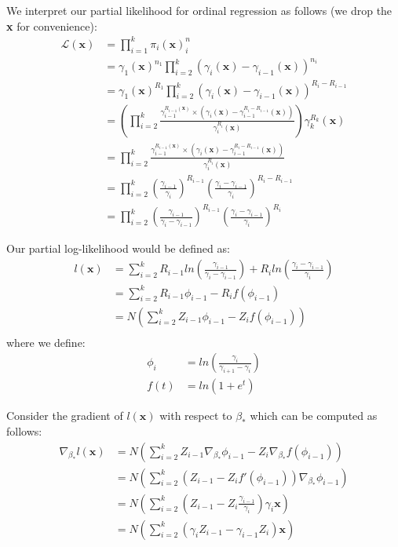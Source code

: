 \documentclass[a4paper, 11pt]{article}
\begin{document}
We interpret our partial likelihood for ordinal regression as follows (we drop the \textbf{x} for convenience):
\begin{align}
    \mathcal{L(\textbf{x})} &= \prod_{i=1}^k \pi_i(\textbf{x})^n_i \\
    &= \gamma_1(\textbf{x})^{n_1} \prod_{i=2}^k (\gamma_i(\textbf{x}) - \gamma_{i-1}(\textbf{x}))^{n_i} \\
    &= \gamma_1(\textbf{x})^{R_1} \prod_{i=2}^k (\gamma_i(\textbf{x}) - \gamma_{i-1}(\textbf{x}))^{R_i - R_{i-1}} \\
    &= \left( \prod_{i=2}^k \frac{\gamma_{i-1}^{R_{i-1}(\textbf{x})} \times (\gamma_i(\textbf{x}) - \gamma_{i-1}^{R_i - R_{i-1}}(\textbf{x}))}{\gamma_{i}^{R_{i}}(\textbf{x})} \right) \gamma_k^{R_k}(\textbf{x})\\
    &= \prod_{i=2}^k \frac{\gamma_{i-1}^{R_{i-1}(\textbf{x})} \times (\gamma_i(\textbf{x}) - \gamma_{i-1}^{R_i - R_{i-1}}(\textbf{x}))}{\gamma_{i}^{R_{i}}(\textbf{x})} \\
    &= \prod_{i=2}^k \left(\frac{\gamma_{i-1}}{\gamma_i}\right)^{R_{i-1}} \left(\frac{\gamma_i - \gamma_{i-1}}{\gamma_i}\right)^{R_i - R_{i-1}} \\
    &= \prod_{i=2}^k \left(\frac{\gamma_{i-1}}{\gamma_i - \gamma_{i-1}}\right)^{R_{i-1}} \left(\frac{\gamma_i - \gamma_{i-1}}{\gamma_i}\right)^{R_i}
\end{align}

Our partial log-likelihood would be defined as:
\begin{align}
    l(\textbf{x}) &= \sum_{i=2}^k R_{i-1}ln\left(\frac{\gamma_{i-1}}{\gamma_i - \gamma_{i-1}}\right) + R_iln\left(\frac{\gamma_i - \gamma_{i-1}}{\gamma_i}\right) \\
    &= \sum_{i=2}^k R_{i-1}\phi_{i-1} - R_i f(\phi_{i-1}) \\
    &= N \left( \sum_{i=2}^k Z_{i-1}\phi_{i-1} - Z_i f(\phi_{i-1}) \right) \\
\end{align}
where we define:
\begin{align}
    \phi_{i} &= ln\left(\frac{\gamma_{i}}{\gamma_{i+1} - \gamma_{i}}\right) \\
    f(t) &= ln(1 + e^t)
\end{align}

Consider the gradient of $l(\textbf{x})$ with respect to $\beta_*$ which can be computed as follows:
\begin{align}
    \nabla_{\beta_*}l(\textbf{x}) &= N \left( \sum_{i=2}^k Z_{i-1} \nabla_{\beta_*}\phi_{i-1} - Z_i \nabla_{\beta_*}f(\phi_{i-1}) \right) \\
    &= N \left( \sum_{i=2}^k \left( Z_{i-1} - Z_i f'(\phi_{i-1}) \right) \nabla_{\beta_*}\phi_{i-1} \right) \\
    &= N \left( \sum_{i=2}^k \left( Z_{i-1} - Z_i \frac{\gamma_{i-1}}{\gamma_i} \right) \gamma_{i}\textbf{x} \right) \\
    &= N \left( \sum_{i=2}^k \left( \gamma_i Z_{i-1} - \gamma_{i-1} Z_i \right) \textbf{x} \right)
\end{align}
\end{document}
